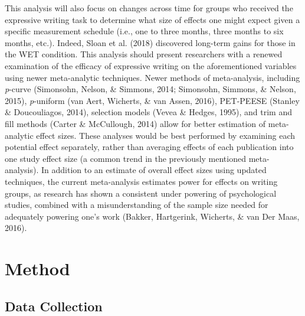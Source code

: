 \documentclass[,man]{apa6}
\begin{document}
This analysis will also focus on changes across time for groups who received the expressive writing task to determine what size of effects one might expect given a specific measurement schedule (i.e., one to three months, three months to six months, etc.). Indeed, Sloan et al. (2018) discovered long-term gains for those in the WET condition. This analysis should present researchers with a renewed examination of the efficacy of expressive writing on the aforementioned variables using newer meta-analytic techniques. Newer methods of meta-analysis, including \emph{p}-curve (Simonsohn, Nelson, \& Simmons, 2014; Simonsohn, Simmons, \& Nelson, 2015), \emph{p}-uniform (van Aert, Wicherts, \& van Assen, 2016), PET-PEESE (Stanley \& Doucouliagos, 2014), selection models (Vevea \& Hedges, 1995), and trim and fill methods (Carter \& McCullough, 2014) allow for better estimation of meta-analytic effect sizes. These analyses would be best performed by examining each potential effect separately, rather than averaging effects of each publication into one study effect size (a common trend in the previously mentioned meta-analysis). In addition to an estimate of overall effect sizes using updated techniques, the current meta-analysis estimates power for effects on writing groups, as research has shown a consistent under powering of psychological studies, combined with a misunderstanding of the sample size needed for adequately powering one's work (Bakker, Hartgerink, Wicherts, \& van Der Maas, 2016).

\hypertarget{method}{%
\section{Method}\label{method}}

\hypertarget{data-collection}{%
\subsection{Data Collection}\label{data-collection}}
\end{document}
